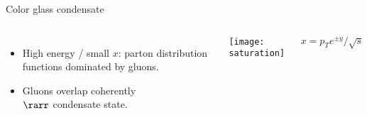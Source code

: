 \documentclass{beamer}
\begin{document}
\begin{frame}[label=kln]{Color glass condensate}
  \begin{columns}
    \begin{itemize}
      \item High energy / small $x$:  parton distribution functions dominated by gluons.
      \item Gluons overlap coherently \\ $\rarr$ condensate state.
    \end{itemize}

    
    \texttt{[image: saturation]}

    \begin{equation*}
      x = p_T e^{\pm y}/\sqrt s
    \end{equation*}
  \end{columns}

\end{frame}
\end{document}

